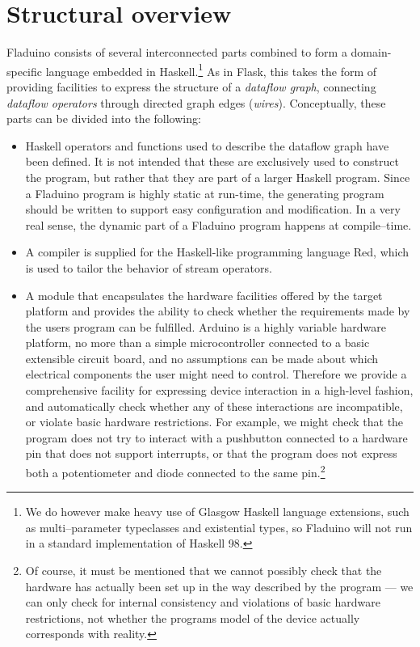 \documentclass[a4paper, oneside, draft]{memoir}
\begin{document}
\section{Structural overview}

Fladuino consists of several interconnected parts combined to form a
domain-specific language embedded in Haskell.\footnote{We do however
  make heavy use of Glasgow Haskell language extensions, such as
  multi--parameter typeclasses and existential types, so Fladuino will
  not run in a standard implementation of Haskell 98.}  As in Flask,
this takes the form of providing facilities to express the structure
of a \textit{dataflow graph}, connecting \textit{dataflow operators}
through directed graph edges (\textit{wires}).  Conceptually, these
parts can be divided into the following:

\begin{itemize}
\item Haskell operators and functions used to describe the dataflow
  graph have been defined.  It is not intended that these are
  exclusively used to construct the program, but rather that they are
  part of a larger Haskell program.  Since a Fladuino program is
  highly static at run-time, the generating program should be written
  to support easy configuration and modification.  In a very real
  sense, the dynamic part of a Fladuino program happens at
  compile--time.
\item A compiler is supplied for the Haskell-like programming language
  Red, which is used to tailor the behavior of stream operators.
\item A module that encapsulates the hardware facilities offered by
  the target platform and provides the ability to check whether the
  requirements made by the users program can be fulfilled.  Arduino is
  a highly variable hardware platform, no more than a simple
  microcontroller connected to a basic extensible circuit board, and
  no assumptions can be made about which electrical components the
  user might need to control.  Therefore we provide a comprehensive
  facility for expressing device interaction in a high-level fashion,
  and automatically check whether any of these interactions are
  incompatible, or violate basic hardware restrictions.  For example,
  we might check that the program does not try to interact with a
  pushbutton connected to a hardware pin that does not support
  interrupts, or that the program does not express both a
  potentiometer and diode connected to the same pin.\footnote{Of
    course, it must be mentioned that we cannot possibly check that
    the hardware has actually been set up in the way described by the
    program --- we can only check for internal consistency and
    violations of basic hardware restrictions, not whether the
    programs model of the device actually corresponds with reality.}


\end{itemize}
\end{document}
